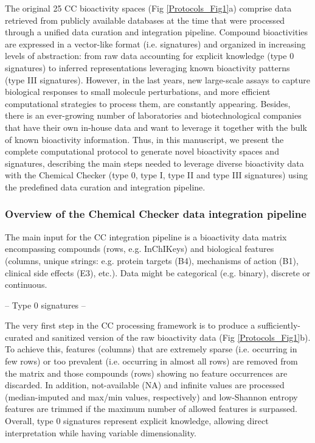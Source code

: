 The original 25 CC bioactivity spaces (Fig \ref{Protocols_Fig1}a) comprise data retrieved from publicly available databases at the time that were processed through a unified data curation and integration pipeline. Compound bioactivities are expressed in a vector-like format (i.e. signatures) and organized in increasing levels of abstraction: from raw data accounting for explicit knowledge (type 0 signatures) to inferred representations leveraging known bioactivity patterns (type III signatures). However, in the last years, new large-scale assays to capture biological responses to small molecule perturbations, and more efficient computational strategies to process them, are constantly appearing\cite{anglada-girotto_combining_2022, mitchell_proteome-wide_2023, offensperger_large-scale_2024}. Besides, there is an ever-growing number of laboratories and biotechnological companies that have their own in-house data and want to leverage it together with the bulk of known bioactivity information. Thus, in this manuscript, we present the complete computational protocol to generate novel bioactivity spaces and signatures, describing the main steps needed to leverage diverse bioactivity data with the Chemical Checker (type 0, type I, type II and type III signatures) using the predefined data curation and integration pipeline.

\subsubsection{Overview of the Chemical Checker data integration pipeline}

The main input for the CC integration pipeline is a bioactivity data matrix encompassing compounds (rows, e.g. InChIKeys) and biological features (columns, unique strings: e.g. protein targets (B4), mechanisms of action (B1), clinical side effects (E3), etc.). Data might be categorical (e.g. binary), discrete or continuous.

-- Type 0 signatures --

The very first step in the CC processing framework is to produce a sufficiently-curated and sanitized version of the raw bioactivity data (Fig \ref{Protocols_Fig1}b). To achieve this, features (columns) that are extremely sparse (i.e. occurring in few rows) or too prevalent (i.e. occurring in almost all rows) are removed from the matrix and those compounds (rows) showing no feature occurrences are discarded. In addition, not-available (NA) and infinite values are processed (median-imputed and max/min values, respectively) and low-Shannon entropy features are trimmed if the maximum number of allowed features is surpassed. Overall, type 0 signatures represent explicit knowledge, allowing direct interpretation while having variable dimensionality. 

